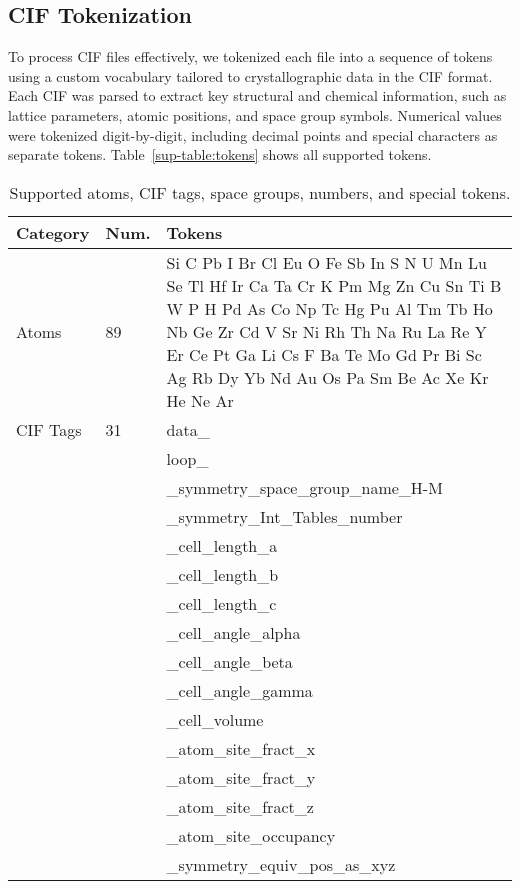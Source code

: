 \subsection{CIF Tokenization}\label{sup-sec:cif_tokenization}

To process CIF files effectively, we tokenized each file into a sequence of tokens using a custom vocabulary tailored to crystallographic data in the CIF format. Each CIF was parsed to extract key structural and chemical information, such as lattice parameters, atomic positions, and space group symbols. Numerical values were tokenized digit-by-digit, including decimal points and special characters as separate tokens. Table~\ref{sup-table:tokens} shows all supported tokens.

\begin{table}[ht!]
\centering
\caption{Supported atoms, CIF tags, space groups, numbers, and special tokens.}
\small
\begin{tabular}{p{1.5cm}p{1cm}p{10cm}}
\toprule
\textbf{Category} & \textbf{Num.} & \textbf{Tokens} \\
\midrule
Atoms & 89 & Si  C  Pb  I  Br  Cl  Eu  O  Fe  Sb  In  S  N  U  Mn  Lu  Se  Tl  Hf  Ir  Ca  Ta  Cr  K  Pm  Mg  Zn  Cu  Sn  Ti  B  W  P  H  Pd  As  Co  Np  Tc  Hg  Pu  Al  Tm  Tb  Ho  Nb  Ge  Zr  Cd  V  Sr  Ni  Rh  Th  Na  Ru  La  Re  Y  Er  Ce  Pt  Ga  Li  Cs  F  Ba  Te  Mo  Gd  Pr  Bi  Sc  Ag  Rb  Dy  Yb  Nd  Au  Os  Pa  Sm  Be  Ac  Xe  Kr  He  Ne  Ar \\
\midrule
CIF Tags & 31
& data\_ \\
& & loop\_ \\
& & \_symmetry\_space\_group\_name\_H-M \\
& & \_symmetry\_Int\_Tables\_number \\
& & \_cell\_length\_a \\
& & \_cell\_length\_b \\
& & \_cell\_length\_c\\
& & \_cell\_angle\_alpha \\
& & \_cell\_angle\_beta \\
& & \_cell\_angle\_gamma \\
& & \_cell\_volume \\
& & \_atom\_site\_fract\_x \\
& & \_atom\_site\_fract\_y \\
& & \_atom\_site\_fract\_z \\
& & \_atom\_site\_occupancy \\
& & \_symmetry\_equiv\_pos\_as\_xyz \\

\end{tabular}
\end{table}
